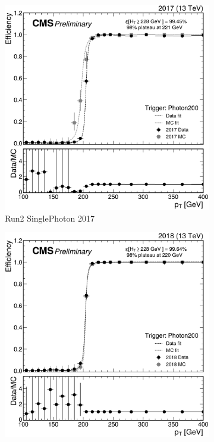 \begin{figure}
	\begin{subfigure}{.45\textwidth}
		\includegraphics[width=\linewidth]{Images/pdfs/17_SinglePhoton_efficiency_withratio_and_fits.pdf}
		\caption{Run2 SinglePhoton 2017}
		\label{fig:HT_eff_SinglePhoton_17}
	\end{subfigure}
	\begin{subfigure}{.45\textwidth}
		\includegraphics[width=\linewidth]{Images/pdfs/18_SinglePhoton_efficiency_withratio_and_fits.pdf}

\end{subfigure}
\end{figure}
